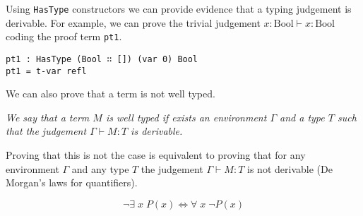 \documentclass{article}
\begin{document}
Using \texttt{HasType} constructors we can provide evidence that a typing judgement is derivable.
For example, we can prove the trivial judgement $x : \text{Bool} \vdash x : \text{Bool}$ coding the proof term \texttt{pt1}.

\begin{verbatim}
pt1 : HasType (Bool ∷ []) (var 0) Bool
pt1 = t-var refl
\end{verbatim}

We can also prove that a term is not well typed.

\vspace{1em}
\textit{We say that a term $M$ is well typed if exists an environment $\Gamma$ and a type $T$ such that the judgement $\Gamma \vdash M : T$ is derivable.}
\vspace{1em}

Proving that this is not the case is equivalent to proving that for any environment $\Gamma$ and any type $T$ the judgement $\Gamma \vdash M : T$ is not derivable (De Morgan’s laws for quantifiers).

\[
\neg \exists \; x \; P(x) \iff \forall \; x \; \neg P(x)
\]
\end{document}
